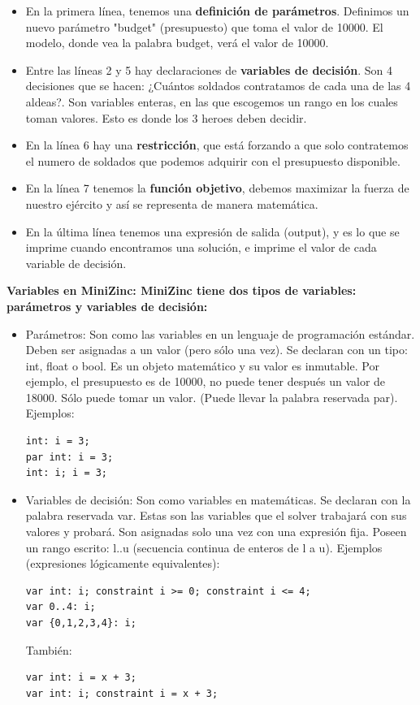 \documentclass[12pt]{article}
\begin{document}
\begin{itemize}
\item En la primera línea, tenemos una \textbf{definición de parámetros}. Definimos un nuevo parámetro "budget" (presupuesto) que toma el valor de 10000. El modelo, donde vea la palabra budget, verá el valor de 10000. 
\item Entre las líneas 2 y 5 hay declaraciones de \textbf{variables de decisión}. Son 4 decisiones que se hacen: ¿Cuántos soldados contratamos de cada una de las 4 aldeas?. Son variables enteras, en las que escogemos un rango en los cuales toman valores. Esto es donde los 3 heroes deben decidir.
\item En la línea 6 hay una \textbf{restricción}, que está forzando a que solo contratemos el numero de soldados que podemos adquirir con el presupuesto disponible.
\item En la línea 7 tenemos la \textbf{función objetivo}, debemos maximizar la fuerza de nuestro ejército y así se representa de manera matemática.
\item En la última línea tenemos una expresión de salida (output), y es lo que se imprime cuando encontramos una solución, e imprime el valor de cada variable de decisión. 
\end{itemize}

\begin{justify}
\textbf{Variables en MiniZinc: MiniZinc tiene dos tipos de variables: parámetros y variables de decisión:}
\end{justify}

\begin{itemize}
\item Parámetros: Son como las variables en un lenguaje de programación estándar. Deben ser asignadas a un valor (pero sólo una vez). Se declaran con un tipo: int, float o bool. Es un objeto matemático y su valor es inmutable. Por ejemplo, el presupuesto es de 10000, no puede tener después un valor de 18000. Sólo puede tomar un valor. (Puede llevar la palabra reservada par). Ejemplos:
\begin{Verbatim}
int: i = 3;
par int: i = 3;
int: i; i = 3;
\end{Verbatim}
\item Variables de decisión: Son como variables en matemáticas. Se declaran con la palabra reservada var. Estas son las variables que el solver trabajará con sus valores y probará. Son asignadas solo una vez con una expresión fija. Poseen un rango escrito: l..u (secuencia continua de enteros de l a u). Ejemplos (expresiones lógicamente equivalentes):
\begin{Verbatim}
var int: i; constraint i >= 0; constraint i <= 4;
var 0..4: i;
var {0,1,2,3,4}: i;
\end{Verbatim}
También:
\begin{Verbatim}
var int: i = x + 3;
var int: i; constraint i = x + 3;
\end{Verbatim}
\end{itemize}
\end{document}

